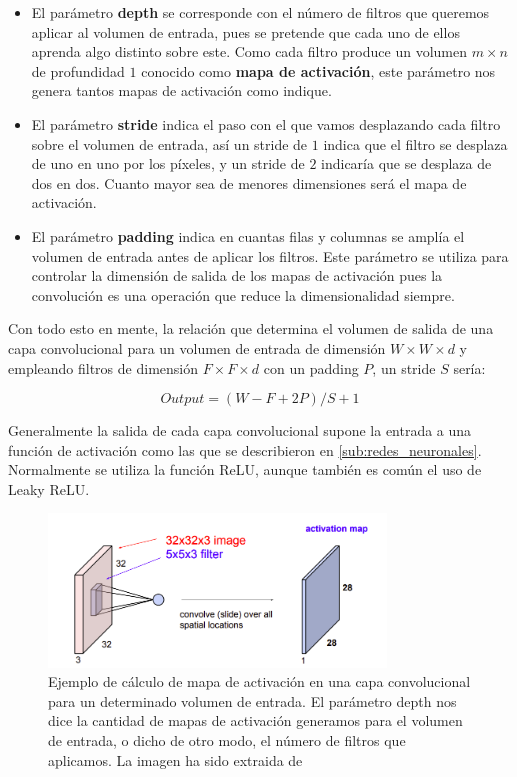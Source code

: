         \begin{itemize}
            \item El parámetro \textbf{depth} se corresponde con el número de filtros que queremos aplicar al volumen de entrada, pues se pretende que cada uno de ellos aprenda algo distinto sobre este. Como cada filtro produce un volumen $m \times n$ de profundidad $1$ conocido como \textbf{mapa de activación}, este parámetro nos genera tantos mapas de activación como indique.
            \item El parámetro \textbf{stride} indica el paso con el que vamos desplazando cada filtro sobre el volumen de entrada, así un stride de $1$ indica que el filtro se desplaza de uno en uno por los píxeles, y un stride de $2$ indicaría que se desplaza de dos en dos. Cuanto mayor sea de menores dimensiones será el mapa de activación.
            \item El parámetro \textbf{padding} indica en cuantas filas y columnas se amplía el volumen de entrada antes de aplicar los filtros. Este parámetro se utiliza para controlar la dimensión de salida de los mapas de activación pues la convolución es una operación que reduce la dimensionalidad siempre.
        \end{itemize}

        \noindent Con todo esto en mente, la relación que determina el volumen de salida de una capa convolucional para un volumen de entrada de dimensión $W \times W \times d$ y empleando filtros de dimensión $F \times F \times d$ con un padding $P$, un stride $S$ sería: 

        \begin{equation}
            Output=(W-F + 2P)/S + 1
        \end{equation}

        \medskip
        
        \noindent Generalmente la salida de cada capa convolucional supone la entrada a una función de activación como las que se describieron en \autoref{sub:redes_neuronales}. Normalmente se utiliza la función ReLU, aunque también es común el uso de Leaky ReLU.

        \begin{figure}[!h]
            \centering
            \includegraphics[width=0.8\textwidth]{img/mapa_activacion.png}
            \caption{Ejemplo de cálculo de mapa de activación en una capa convolucional para un determinado volumen de entrada. El parámetro depth nos dice la cantidad de mapas de activación generamos para el volumen de entrada, o dicho de otro modo, el número de filtros que aplicamos. La imagen ha sido extraida de \cite{StanfordCourse}}
            \label{fig:mapa_activacion}
        \end{figure}

